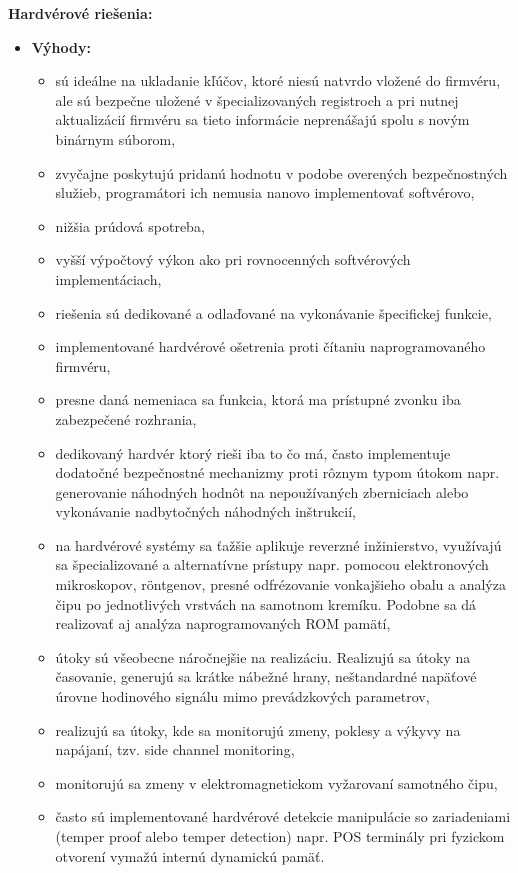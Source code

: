 \documentclass[12pt,a4paper,oneside,openright]{report}
\begin{document}
	\textbf{Hardvérové riešenia:}
	\begin{itemize}
		\item \textbf{Výhody:}
		\begin{itemize}
			\item sú ideálne na ukladanie kľúčov, ktoré niesú natvrdo vložené do firmvéru, ale sú bezpečne uložené v špecializovaných registroch a pri nutnej aktualizácií firmvéru sa tieto informácie neprenášajú spolu s novým binárnym súborom,
			\item zvyčajne poskytujú pridanú hodnotu v podobe overených bezpečnostných služieb, programátori ich nemusia nanovo implementovať softvérovo, 
			\item nižšia prúdová spotreba,
			\item vyšší výpočtový výkon ako pri rovnocenných softvérových implementáciach,
			\item riešenia sú dedikované a odlaďované na vykonávanie špecifickej funkcie,
			\item implementované hardvérové ošetrenia proti čítaniu naprogramovaného firmvéru,
			\item presne daná nemeniaca sa funkcia, ktorá ma prístupné zvonku iba zabezpečené rozhrania,
			\item dedikovaný hardvér ktorý rieši iba to čo má, často implementuje dodatočné bezpečnostné mechanizmy proti rôznym typom útokom napr. generovanie náhodných hodnôt na nepoužívaných zberniciach alebo vykonávanie nadbytočných náhodných inštrukcií,
			
			\item na hardvérové systémy sa ťažšie aplikuje reverzné inžinierstvo, využívajú sa špecializované a alternatívne prístupy napr. pomocou elektronových mikroskopov, röntgenov, presné odfrézovanie vonkajšieho obalu a analýza čipu po jednotlivých vrstvách na samotnom kremíku. Podobne sa dá realizovať aj analýza naprogramovaných ROM pamätí,
			\item útoky sú všeobecne náročnejšie na realizáciu. Realizujú sa útoky na časovanie, generujú sa krátke nábežné hrany, neštandardné napäťové úrovne hodinového signálu mimo prevádzkových parametrov,  
			\item realizujú sa útoky, kde sa monitorujú zmeny, poklesy a výkyvy na napájaní, tzv. side channel monitoring,
			\item monitorujú sa zmeny v elektromagnetickom vyžarovaní samotného čipu,
			\item často sú implementované hardvérové detekcie manipulácie so zariadeniami (temper proof alebo temper detection) napr. POS terminály pri fyzickom otvorení vymažú internú dynamickú pamäť.			


\end{itemize}
\end{itemize}
\end{document}
